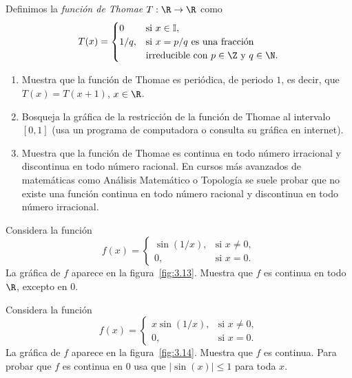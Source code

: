 \documentclass[12pt,a4paper]{book}
\newcommand{\I}{\mathbb{I}}
\begin{document}
    \begin{ejercicio}\label{ej:195}
        Definimos la \textit{función de Thomae}
        $T:\R\to\R$ como
        \begin{equation*}
            T(x)=\begin{cases}
                0 & \text{si }x\in\I,\\
                1/q, & \text{si }x=p/q\text{ es una fracción}\\
                & \text{irreducible con }p\in\Z\text{ y }q\in\N.
            \end{cases}
        \end{equation*}
        \begin{enumerate}[nosep]
            \item Muestra que la función de Thomae es periódica, de periodo $1$, es decir,
            que $T(x)=T(x+1)$, $x\in\R$.
            \item Bosqueja la gráfica de la restricción de la función de Thomae al intervalo
            $[0,1]$ (usa un programa de computadora o consulta su gráfica en internet).
            \item Muestra que la función de Thomae es continua en todo número irracional
            y discontinua en todo número racional. En cursos más avanzados de
            matemáticas como Análisis Matemático o Topología se suele probar que
            no existe una función continua en todo número racional y discontinua en
            todo número irracional.
        \end{enumerate}
    \end{ejercicio}

    \begin{ejercicio}\label{ej:196}
        Considera la función
        \begin{equation*}
            f(x)=\begin{cases}
                \sin(1/x), & \text{si }x\neq 0,\\
                0, & \text{si }x=0.
            \end{cases}
        \end{equation*}
        La gráfica de $f$ aparece en la figura~\ref{fig:3.13}. Muestra que $f$ es continua en todo
        $\R$, excepto en $0$.
    \end{ejercicio}

    \begin{ejercicio}\label{ej:197}
        Considera la función
        \begin{equation*}
            f(x)=\begin{cases}
                x\sin(1/x), & \text{si }x\neq 0,\\
                0, & \text{si }x=0.
            \end{cases}
        \end{equation*}
        La gráfica de $f$ aparece en la figura~\ref{fig:3.14}. Muestra que $f$ es continua. \sugerencia
        Para probar que $f$ es continua en $0$ usa que $|\sin(x)|\leq 1$ para toda
        $x$.
    \end{ejercicio}
\end{document}
